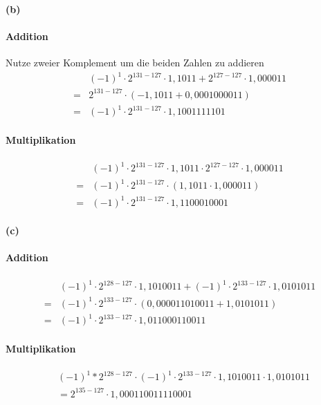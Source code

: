 \documentclass[a4paper]{article}
\begin{document}
\paragraph{(b)}
\paragraph{Addition}
Nutze zweier Komplement um die beiden Zahlen zu addieren
\begin{align*}
    &(-1)^1\cdot 2^{131-127} \cdot1,1011 + 2^{127-127}\cdot 1,000011\\
    =&2^{131-127}\cdot(-1,1011+0,0001000011)\\
    =&(-1)^1\cdot2^{131-127}\cdot 1,1001111101
\end{align*}
\paragraph{Multiplikation}
\begin{align*}
     &(-1)^1\cdot 2^{131-127} \cdot1,1011 \cdot 2^{127-127}\cdot 1,000011\\
     =&(-1)^1\cdot 2^{131-127}\cdot(1,1011\cdot1,000011)\\
     =&(-1)^1\cdot 2^{131-127}\cdot1,1100010001
\end{align*}

\paragraph{(c)}
\paragraph{Addition}
\begin{align*}
    &(-1)^1\cdot2^{128-127}\cdot1,1010011+(-1)^1\cdot2^{133-127}\cdot1,0101011\\
    =&(-1)^1\cdot2^{133-127}\cdot(0,000011010011+1,0101011)\\
    =&(-1)^1\cdot2^{133-127}\cdot1,011000110011
\end{align*}

\paragraph{Multiplikation}
\begin{align*}
    &(-1)^1*2^{128-127}\cdot(-1)^1\cdot2^{133-127}\cdot1,1010011\cdot1,0101011\\
    &=2^{135-127}\cdot1,000110011110001
\end{align*}
\end{document}
